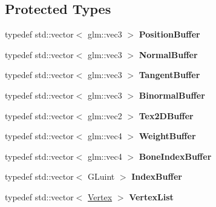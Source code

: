 \subsection*{Protected Types}
\begin{DoxyCompactItemize}
\item 
typedef std\+::vector$<$ glm\+::vec3 $>$ {\bfseries Position\+Buffer}\hypertarget{class_m_d5_model_afbe151d3252967ec25065c49a3396b52}{}\label{class_m_d5_model_afbe151d3252967ec25065c49a3396b52}

\item 
typedef std\+::vector$<$ glm\+::vec3 $>$ {\bfseries Normal\+Buffer}\hypertarget{class_m_d5_model_a2d26390c6b2a1dfe57e7edb9aaad7284}{}\label{class_m_d5_model_a2d26390c6b2a1dfe57e7edb9aaad7284}

\item 
typedef std\+::vector$<$ glm\+::vec3 $>$ {\bfseries Tangent\+Buffer}\hypertarget{class_m_d5_model_a878f3bbbffac6acd58ccaef684033902}{}\label{class_m_d5_model_a878f3bbbffac6acd58ccaef684033902}

\item 
typedef std\+::vector$<$ glm\+::vec3 $>$ {\bfseries Binormal\+Buffer}\hypertarget{class_m_d5_model_a8688f477ee79f7648f1c94eb54530082}{}\label{class_m_d5_model_a8688f477ee79f7648f1c94eb54530082}

\item 
typedef std\+::vector$<$ glm\+::vec2 $>$ {\bfseries Tex2\+D\+Buffer}\hypertarget{class_m_d5_model_a3f7834af7a383634536b41b914e9ea80}{}\label{class_m_d5_model_a3f7834af7a383634536b41b914e9ea80}

\item 
typedef std\+::vector$<$ glm\+::vec4 $>$ {\bfseries Weight\+Buffer}\hypertarget{class_m_d5_model_aea3633af5a03a90e730052bb85b81b8c}{}\label{class_m_d5_model_aea3633af5a03a90e730052bb85b81b8c}

\item 
typedef std\+::vector$<$ glm\+::vec4 $>$ {\bfseries Bone\+Index\+Buffer}\hypertarget{class_m_d5_model_a8bf79bf99b177408c1b4809e4235f7cc}{}\label{class_m_d5_model_a8bf79bf99b177408c1b4809e4235f7cc}

\item 
typedef std\+::vector$<$ G\+Luint $>$ {\bfseries Index\+Buffer}\hypertarget{class_m_d5_model_a70552011c4b7f707a3204f0baef41a75}{}\label{class_m_d5_model_a70552011c4b7f707a3204f0baef41a75}

\item 
typedef std\+::vector$<$ \hyperlink{struct_m_d5_model_1_1_vertex}{Vertex} $>$ {\bfseries Vertex\+List}\hypertarget{class_m_d5_model_ae3e2d726f196a6572c45ae8062bfecbe}{}\label{class_m_d5_model_ae3e2d726f196a6572c45ae8062bfecbe}


\end{DoxyCompactItemize}
